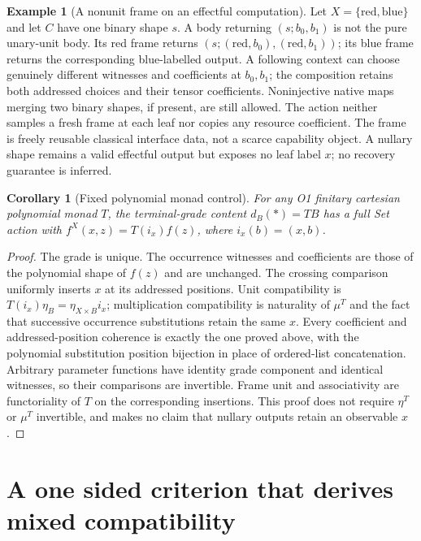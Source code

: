 \documentclass[11pt,a4paper]{article}
\newtheorem{corollary}[theorem]{Corollary}
\theoremstyle{definition}
\newtheorem{example}[theorem]{Example}
\begin{document}
\begin{example}[A nonunit frame on an effectful computation]\label{ex:effect}
Let $X=\{\mathrm{red},\mathrm{blue}\}$ and let $C$ have one binary shape
$s$. A body returning $(s;b_0,b_1)$ is not the pure unary-unit body.
Its red frame returns $(s;(\mathrm{red},b_0),(\mathrm{red},b_1))$;
its blue frame returns the corresponding blue-labelled output. A following
context can choose genuinely different witnesses and coefficients at
$b_0,b_1$; the composition retains both addressed choices and their tensor
coefficients. Noninjective native maps merging two binary shapes, if present,
are still allowed. The action neither samples a fresh frame at each leaf nor
copies any resource coefficient. The frame is freely reusable classical
interface data, not a scarce capability object. A nullary shape remains a
valid effectful output but exposes no leaf label $x$; no recovery guarantee
is inferred.
\end{example}

\begin{corollary}[Fixed polynomial monad control]\label{cor:fixed}
For any O1 finitary cartesian polynomial monad $T$, the terminal-grade content
$d_B(*)=TB$ has a full Set action with
$f^X(x,z)=T(i_x)f(z)$, where $i_x(b)=(x,b)$.
\end{corollary}
\begin{proof}
The grade is unique. The occurrence witnesses and coefficients are those of
the polynomial shape of $f(z)$ and are unchanged. The crossing comparison
uniformly inserts $x$ at its addressed positions. Unit compatibility is
$T(i_x)\eta_B=\eta_{X\times B}i_x$; multiplication compatibility is
naturality of $\mu^T$ and the fact that successive occurrence substitutions
retain the same $x$. Every coefficient and addressed-position coherence is
exactly the one proved above, with the polynomial substitution position
bijection in place of ordered-list concatenation. Arbitrary parameter
functions have identity grade component and identical witnesses, so their
comparisons are invertible. Frame unit and associativity are functoriality
of $T$ on the corresponding insertions. This proof does not require
$\eta^T$ or $\mu^T$ invertible, and makes no claim that nullary outputs retain
an observable $x$.
\end{proof}

\section{A one sided criterion that derives mixed compatibility}\label{sec:transfer}
\end{document}
